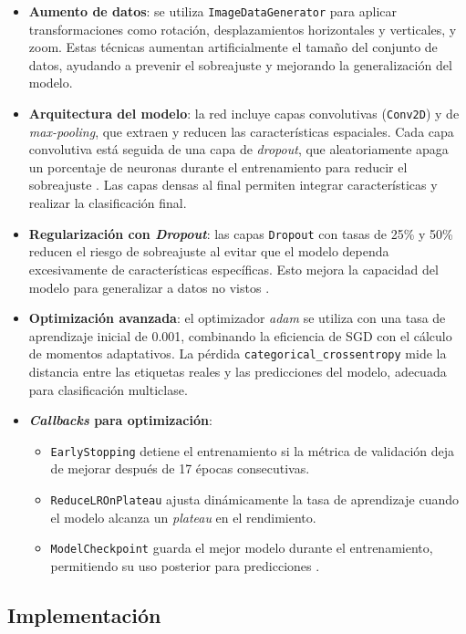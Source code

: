 \begin{itemize}
	\item \textbf{Aumento de datos}: se utiliza \texttt{ImageDataGenerator} para aplicar transformaciones como rotación, desplazamientos horizontales y verticales, y zoom. Estas técnicas aumentan artificialmente el tamaño del conjunto de datos, ayudando a prevenir el sobreajuste y mejorando la generalización del modelo.
	\item \textbf{Arquitectura del modelo}: la red incluye capas convolutivas (\texttt{Conv2D}) y de \textit{max-pooling}, que extraen y reducen las características espaciales. Cada capa convolutiva está seguida de una capa de \textit{dropout}, que aleatoriamente apaga un porcentaje de neuronas durante el entrenamiento para reducir el sobreajuste \parencite{srivastava2014dropout}. Las capas densas al final permiten integrar características y realizar la clasificación final.
	\item \textbf{Regularización con \textit{Dropout}}: las capas \texttt{Dropout} con tasas de 25\% y 50\% reducen el riesgo de sobreajuste al evitar que el modelo dependa excesivamente de características específicas. Esto mejora la capacidad del modelo para generalizar a datos no vistos \parencite{srivastava2014dropout}.
	\item \textbf{Optimización avanzada}: el optimizador \textit{adam} se utiliza con una tasa de aprendizaje inicial de 0.001, combinando la eficiencia de SGD con el cálculo de momentos adaptativos. La pérdida \texttt{categorical\_crossentropy} mide la distancia entre las etiquetas reales y las predicciones del modelo, adecuada para clasificación multiclase.
	
	\item \textbf{\textit{Callbacks} para optimización}: 
	\begin{itemize}
		\item \texttt{EarlyStopping} detiene el entrenamiento si la métrica de validación deja de mejorar después de 17 épocas consecutivas.
		\item \texttt{ReduceLROnPlateau} ajusta dinámicamente la tasa de aprendizaje cuando el modelo alcanza un \textit{plateau} en el rendimiento.
		\item \texttt{ModelCheckpoint} guarda el mejor modelo durante el entrenamiento, permitiendo su uso posterior para predicciones \parencite{bengio2012practical}.
	\end{itemize}
\end{itemize}


\subsection{Implementación}

